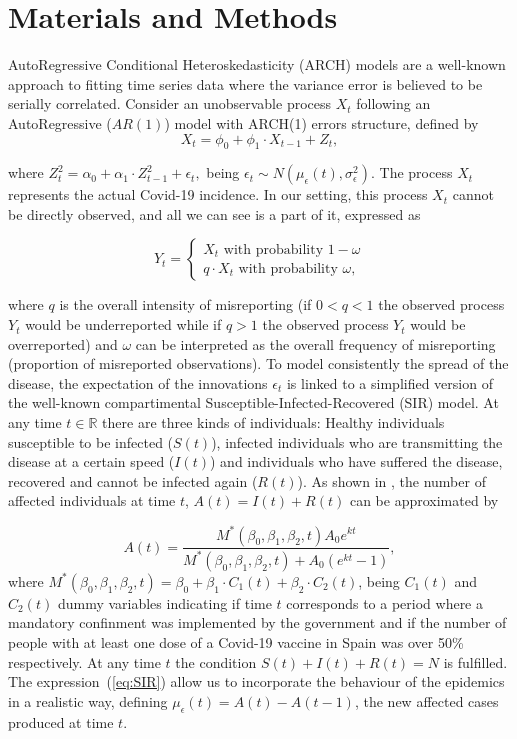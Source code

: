 \documentclass{article}
\begin{document}
\section{Materials and Methods}\label{methods}
AutoRegressive Conditional Heteroskedasticity (ARCH) models are a well-known approach to fitting time series data where the variance error is believed to be serially correlated. Consider an unobservable process $X_t$ following an AutoRegressive ($AR(1)$) model with ARCH(1) errors structure, defined by
$$
X_t = \phi_0 + \phi_1 \cdot X_{t-1} + Z_t,
$$

where $Z^2_t=\alpha_0+\alpha_1 \cdot Z^2_{t-1} + \epsilon_t,$ being $\epsilon_t \sim N(\mu_{\epsilon}(t), \sigma_{\epsilon}^2)$. The process $X_t$ represents the actual Covid-19 incidence. In our setting, this process $X_t$ cannot be directly observed, and all we can see is a part of it, expressed as

\begin{equation}\label{morina:eq1}
    Y_t=\left\{
                \begin{array}{ll}
                  X_t \text{ with probability } 1-\omega \\
                  q \cdot X_t \text{ with probability } \omega,
                \end{array}
              \right.
\end{equation}

where $q$ is the overall intensity of misreporting (if $0 < q < 1$ the observed process $Y_t$ would be underreported while if $q > 1$ the observed process $Y_t$ would be overreported) and $\omega$ can be interpreted as the overall frequency of misreporting (proportion of misreported observations). To model consistently the spread of the disease, the expectation of the innovations $\epsilon_t$ is linked to a simplified version of the well-known compartimental Susceptible-Infected-Recovered (SIR) model. At any time $t \in \mathbb{R}$ there are three kinds of individuals: Healthy individuals susceptible to be infected ($S(t)$), infected individuals who are transmitting the disease at a certain speed ($I(t)$) and individuals who have suffered the disease, recovered and cannot be infected again ($R(t)$). As shown in \cite{Fernandez-Fontelo2020}, the number of affected individuals at time $t$, $A(t) = I(t) + R(t)$ can be approximated by

\begin{equation}\label{eq:SIR}
  A(t) = \frac{M^{*}(\beta_0, \beta_1, \beta_2, t) A_0 e^{kt}}{M^{*}(\beta_0, \beta_1, \beta_2, t)+A_0(e^{kt}-1)},
\end{equation}
where $M^{*}(\beta_0, \beta_1, \beta_2, t) = \beta_0+\beta_1 \cdot C_1(t) + \beta_2 \cdot C_2(t)$, being $C_1(t)$ and $C_2(t)$ dummy variables indicating if time $t$ corresponds to a period where a mandatory confinment was implemented by the government and if the number of people with at least one dose of a Covid-19 vaccine in Spain was over 50\% respectively. At any time $t$ the condition $S(t) + I(t) + R(t) = N$ is fulfilled. The expression~(\ref{eq:SIR}) allow us to incorporate the behaviour of the epidemics in a realistic way, defining $\mu_{\epsilon}(t) = A(t) - A(t-1)$, the new affected cases produced at time $t$.
\end{document}
